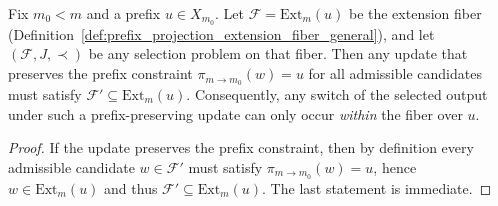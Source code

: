 \begin{proposition}\label{prop:prefix_consistent_switching_constraint}
Fix $m_0<m$ and a prefix $u\in X_{m_0}$.
Let $\mathcal{F}=\mathrm{Ext}_m(u)$ be the extension fiber (Definition~\ref{def:prefix_projection_extension_fiber_general}),
and let $(\mathcal{F},J,\prec)$ be any selection problem on that fiber.
Then any update that preserves the prefix constraint $\pi_{m\to m_0}(w)=u$ for all admissible candidates
must satisfy $\mathcal{F}'\subseteq \mathrm{Ext}_m(u)$.
Consequently, any switch of the selected output under such a prefix-preserving update can only occur \emph{within}
the fiber over $u$.
\end{proposition}

\begin{proof}
If the update preserves the prefix constraint, then by definition every admissible candidate $w\in\mathcal{F}'$
must satisfy $\pi_{m\to m_0}(w)=u$, hence $w\in \mathrm{Ext}_m(u)$ and thus $\mathcal{F}'\subseteq \mathrm{Ext}_m(u)$.
The last statement is immediate.
\end{proof}


